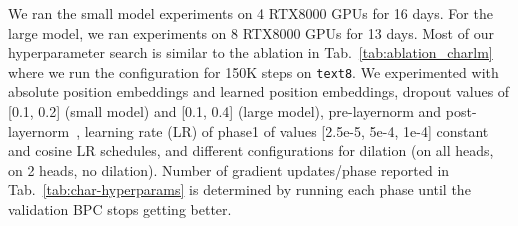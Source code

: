 \documentclass[11pt,a4paper]{article}
\begin{document}
We ran the small model experiments on 4 RTX8000 GPUs for 16 days.
For the large model, we ran experiments on 8 RTX8000 GPUs for 
13 days. 
Most of our hyperparameter search is similar to the ablation in Tab.~\ref{tab:ablation_charlm} where we run the configuration for 150K steps
on \texttt{text8}.
We experimented with absolute position embeddings and learned position embeddings,
dropout values of [0.1, 0.2] (small model) and [0.1, 0.4] (large model), 
pre-layernorm and post-layernorm~\cite{layernorm}, learning rate (LR) of phase1 of values 
[2.5e-5, 5e-4, 1e-4]
constant and cosine LR schedules, 
and different configurations for dilation (on all heads, on 2 heads, no dilation).
Number of gradient updates/phase
reported in Tab.~\ref{tab:char-hyperparams} is determined by running each phase until the validation BPC stops getting better. 
\end{document}
